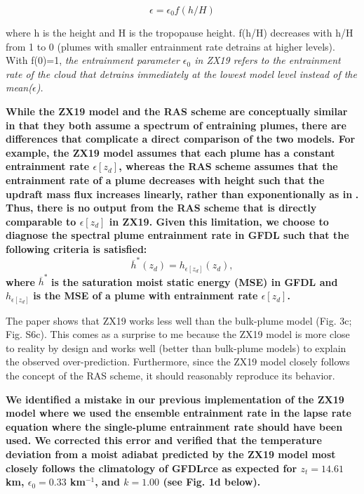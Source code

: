 \documentclass[11pt]{article}
\begin{document}
\begin{equation}
\epsilon = \epsilon_0 f(h/H)
\end{equation}

where h is the height and H is the tropopause height. f(h/H) decreases with h/H from 1 to 0 (plumes with smaller entrainment rate detrains at higher levels). With f(0)=1, \emph{the entrainment parameter \(\epsilon_0\) in ZX19 refers to the entrainment rate of the cloud that detrains immediately at the lowest model level instead of the mean(\(\epsilon\)).}

\textbf{While the ZX19 model and the RAS scheme} \cite{moorthi1992} \textbf{are conceptually similar in that they both assume a spectrum of entraining plumes, there are differences that complicate a direct comparison of the two models. For example, the ZX19 model assumes that each plume has a constant entrainment rate \(\epsilon[z_d]\), whereas the RAS scheme assumes that the entrainment rate of a plume decreases with height such that the updraft mass flux increases linearly, rather than exponentionally as in} \cite{arakawa1974} \textbf{\!\!. Thus, there is no output from the RAS scheme that is directly comparable to \(\epsilon[z_d]\) in ZX19. Given this limitation, we choose to diagnose the spectral plume entrainment rate in GFDL such that the following criteria is satisfied:}
\begin{equation}
\overline{h}^*(z_d) = h_{\epsilon[z_d]}(z_d),
\end{equation}
\textbf{where} \(\overline{h}^*\) \textbf{is the saturation moist static energy (MSE) in GFDL and} \(h_{\epsilon[z_d]}\) \textbf{is the MSE of a plume with entrainment rate \(\epsilon[z_d]\).}

The paper shows that ZX19 works less well than the bulk-plume model (Fig. 3c; Fig. S6c). This comes as a surprise to me because the ZX19 model is more close to reality by design and works well (better than bulk-plume models) to explain the observed over-prediction. Furthermore, since the ZX19 model closely follows the concept of the RAS scheme, it should reasonably reproduce its behavior.

\textbf{We identified a mistake in our previous implementation of the ZX19 model where we used the ensemble entrainment rate in the lapse rate equation where the single-plume entrainment rate should have been used. We corrected this error and verified that the temperature deviation from a moist adiabat predicted by the ZX19 model most closely follows the climatology of GFDLrce as expected for \(z_t=14.61\) km, \(\epsilon_0=0.33\) km}\(^{-1}\)\textbf{, and \(k=1.00\) (see Fig. 1d below).}
\end{document}
